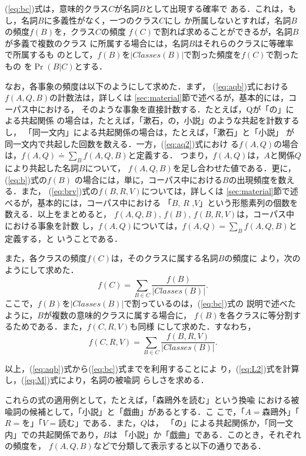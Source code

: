 (\ref{eq:bc})式は，意味的クラス$C$が名詞$B$として出現する確率で
ある．これは，もし，名詞$B$に多義性がなく，一つのクラス$C$にし
か所属しないとすれば，名詞$B$の頻度$f(B)$を，クラス$C$の頻度
$f(C)$で割れば求めることができるが，名詞$B$が多義で複数のクラス
に所属する場合には，名詞$B$はそれらのクラスに等確率で所属するも
のとして，$f(B)$を$|Classes(B)|$で割った頻度を$f(C)$で割ったもの
を$\Pr(B|C)$とする．


なお，各事象の頻度は以下のようにして求めた．まず，
(\ref{eq:aqb})式における$f(A,Q,B)$の計数法は，詳しくは
\ref{sec:material}節で述べるが，基本的には，コーパス中における，
そのような事象を直接計数する．たとえば，Qが「の」による共起関係
の場合は，たとえば，「漱石，の，小説」のような共起を計数するし，
「同一文内」による共起関係の場合は，たとえば，「漱石」と「小説」
が同一文内で共起した回数を数える．一方，(\ref{eq:aq2})式におけ
る$f(A,Q)$の場合は，$f(A,Q) \doteq \sum_B f(A,Q,B)$と定義する．
つまり，$f(A,Q)$は，$A$と関係$Q$により共起した名詞$B$について，
$f(A,Q,B)$を足し合わせた値である．更に，(\ref{eq:b})式の$f(B)$
の場合には，単に，コーパス中における$B$の出現頻度を数える．また，
(\ref{eq:brv})式の$f(B,R,V)$については，詳しくは
\ref{sec:material}節で述べるが，基本的には，コーパス中における
「$B$, $R$ ,$V$」という形態素列の個数を数える．以上をまとめると，
$f(A,Q,B)$, $f(B)$, $f(B,R,V)$は，コーパス中における事象を計数
し，$f(A,Q)$については，$f(A,Q)=\sum_B f(A,Q,B)$と定義する，と
いうことである．

また，各クラスの頻度$f(C)$は，そのクラスに属する名詞$B$の頻度に
より，次のようにして求めた．
\begin{displaymath}
  f(C) = \sum_{B \in C} \frac{f(B)}{|Classes(B)|}.
\end{displaymath}
ここで，$f(B)$を$|Classes(B)|$で割っているのは，(\ref{eq:bc})式の
説明で述べたように，$B$が複数の意味的クラスに属する場合に，
$f(B)$を各クラスに等分割するためである．また，$f(C,R,V)$も同様
にして求めた．すなわち，
\begin{displaymath}
  f(C,R,V) = \sum_{B \in C} \frac{f(B,R,V)}{|Classes(B)|}.
\end{displaymath}

以上，(\ref{eq:aqb})式から(\ref{eq:bc})式までを利用することによ
り，(\ref{eq:L2})式を計算し，(\ref{eq:M})式により，名詞の被喩詞
らしさを求める．

これらの式の適用例として，たとえば，「森鴎外を読む」という換喩
における被喩詞の候補として，「小説」と「戯曲」があるとする．こ
こで，「$A=森鴎外$」「$R=を$」「$V=読む$」である．また，$Q$は，
「の」による共起関係か，「同一文内」での共起関係であり，$B$は
「小説」か「戯曲」である．このとき，それぞれの頻度を，
$f(A,Q,B)$などで分類して表示すると以下の通りである．
